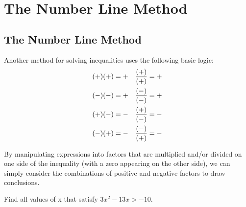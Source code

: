 \chapter{The Number Line Method}

\section{The Number Line Method}

Another method for solving inequalities uses the following basic logic: \\

\begin{align}
	\nonumber
	(+)(+) = + &  & {(+) \over (+)} = + \\
	\nonumber
	(-)(-) = + &  & {(-) \over (-)} = + \\
	\nonumber
	(+)(-) = - &  & {(+) \over (-)} = - \\
	\nonumber
	(-)(+) = - &  & {(-) \over (+)} = -
\end{align}

By manipulating expressions into factors that are multiplied and/or divided on one side of the inequality (with a zero appearing on the other side), we can simply consider the combinations of positive and negative factors to draw conclusions. \\

\begin{exercise}\nonumber
	Find all values of x that satisfy $ 3x^2 - 13x > -10 $. \\

	\begin{align}
		\\
		\\
		\\
		\\
	\end{align}

	\begin{figure}[H]
		\centering
	\end{figure}

	\vspace{1cm}
\end{exercise}

